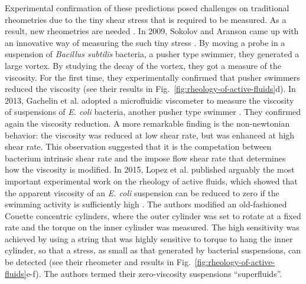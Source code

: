 Experimental confirmation of these predictions posed challenges on traditional rheometries due to the tiny shear stress that is required to be measured. As a result, new rheometries are needed \cite{Marchetti2015}. In 2009, Sokolov and Aranson came up with an innovative way of measuring the such tiny stress \cite{Sokolov2009}. By moving a probe in a suspension of \textit{Bacillus subtilis} bacteria, a pusher type swimmer, they generated a large vortex. By studying the decay of the vortex, they got a measure of the viscosity. For the first time, they experimentally confirmed that pusher swimmers reduced the viscosity (see their results in Fig.~\ref{fig:rheology-of-active-fluids}d). In 2013, Gachelin et al. adopted a microfluidic viscometer to measure the viscosity of suspensions of \textit{E. coli} bacteria, another pusher type swimmer \cite{Gachelin2013}. They confirmed again the viscosity reduction. A more remarkable finding is the non-newtonian behavior: the viscosity was reduced at low shear rate, but was enhanced at high shear rate. This observation suggested that it is the competation between bacterium intrinsic shear rate and the impose flow shear rate that determines how the viscosity is modified. In 2015, Lopez et al. published arguably the most important experimental work on the rheology of active fluids, which showed that the apparent viscosity of an \textit{E. coli} suspension can be reduced to zero if the swimming activity is sufficiently high \cite{Lopez2015}. The authors modified an old-fashioned Couette concentric cylinders, where the outer cylinder was set to rotate at a fixed rate and the torque on the inner cylinder was measured. The high sensitivity was achieved by using a string that was highly sensitive to torque to hang the inner cylinder, so that a stress, as small as that generated by bacterial suspensions, can be detected (see their rheometer and results in Fig.~\ref{fig:rheology-of-active-fluids}e-f). The authors termed their zero-viscosity suspensions ``superfluids''.

